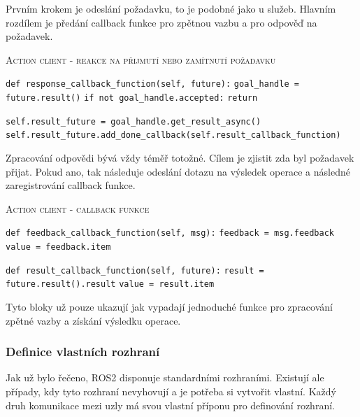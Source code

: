 Prvním krokem je odeslání požadavku, to je podobné jako u služeb. Hlavním rozdílem je předání callback funkce pro zpětnou vazbu a pro odpověď na požadavek.

\begin{algorithm}[h!]
	\label{}
	\caption{\textsc{Action client - reakce na přijmutí nebo zamítnutí požadavku}}
	
	\DontPrintSemicolon
	\SetAlgoNoLine
	\SetNlSty{}{}{:}
	\SetNlSkip{-1.1em}
	
	\BlankLine \Indp\Indpp
	
	\texttt{def response\_callback\_function(self, future):}\;
	\Indp\Indp
	\texttt{goal\_handle = future.result()}\;
	\texttt{if not goal\_handle.accepted:}\;
	\Indp\Indp
	\texttt{return}\;
	\Indm\Indm
	
	\BlankLine
	\texttt{self.result\_future = goal\_handle.get\_result\_async()}\;
	\texttt{self.result\_future.add\_done\_callback(self.result\_callback\_function)}\;
	\Indm\Indm
	
\end{algorithm}
Zpracování odpovědi bývá vždy téměř totožné. Cílem je zjistit zda byl požadavek přijat. Pokud ano, tak následuje odeslání dotazu na výsledek operace a následné zaregistrování callback funkce. \cite{ros2_documentation}

\begin{algorithm}[h!]
	\label{}
	\caption{\textsc{Action client - callback funkce}}
	
	\DontPrintSemicolon
	\SetAlgoNoLine
	\SetAlgoNlRelativeSize{-1}
	\SetNlSty{}{}{:}
	\SetNlSkip{-1.1em}
	
	\BlankLine \Indp\Indpp
	
	\BlankLine
	\texttt{def feedback\_callback\_function(self, msg):}\;
	\Indp\Indp
	\texttt{feedback = msg.feedback}\;
	\texttt{value = feedback.item}\;
	\Indm\Indm
	
	\BlankLine
	\texttt{def result\_callback\_function(self, future):}\;
	\Indp\Indp
	\texttt{result = future.result().result}\;
	\texttt{value = result.item}\;

\end{algorithm}
Tyto bloky už pouze ukazují jak vypadají jednoduché funkce pro zpracování zpětné vazby a získání výsledku operace.

\subsubsection*{Definice vlastních rozhraní} \label{todo}
Jak už bylo řečeno, ROS2 disponuje standardními rozhraními. Existují ale případy, kdy tyto rozhraní nevyhovují a je potřeba si vytvořit vlastní. Každý druh komunikace mezi uzly má svou vlastní příponu pro definování rozhraní. \cite{ros2_introduction}

